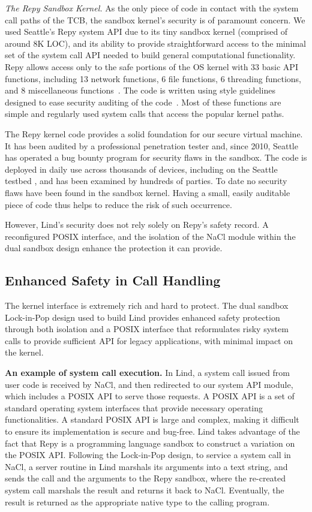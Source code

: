 \textit{The Repy Sandbox Kernel.}
As the only piece of code in contact with the system call paths of the TCB,
the sandbox kernel's security is of paramount concern.
We used Seattle's Repy system API due to its tiny sandbox kernel
(comprised of around 8K LOC), and its ability to provide straightforward
access to the minimal set of the system call API needed to build general
computational functionality. Repy allows
access only to the safe portions of the OS kernel with 33 basic API
functions, including 13 network functions, 6 file functions, 6 threading functions,
and 8 miscellaneous functions~\cite{Repy-10, RepyKernel}. The code is
written using style guidelines designed to ease security auditing
 of the code~\cite{style}. Most of these functions are simple and
regularly used system calls that access the popular kernel paths.

The Repy kernel code provides a solid foundation for our secure virtual
machine. It has been audited by a professional penetration tester and, since 2010,
Seattle has operated a bug bounty program for security flaws in the sandbox.
The code is deployed in daily use across thousands of devices,
including on the Seattle testbed \cite{seattle}, and has been examined by
hundreds of parties. To date no security flaws have been found in the sandbox
kernel. Having a small, easily auditable piece of code thus helps to reduce the
risk of such occurrence.

However, Lind's security does not rely solely on Repy's
safety record. A reconfigured POSIX interface, and the isolation of
the NaCl module within the dual sandbox design enhance the protection it can
provide.

\subsection{Enhanced Safety in Call Handling}

The kernel interface is extremely rich and hard to protect.
The dual sandbox Lock-in-Pop design used to build Lind provides enhanced
safety protection through both isolation and a POSIX interface that
reformulates risky system calls to
provide sufficient API for legacy applications, with minimal impact on the kernel.

\textbf{An example of system call execution.}
In Lind, a system call issued from user code is
received by NaCl, and then redirected to our system API module, which
includes a POSIX API to serve those requests. A POSIX API is a set of standard
operating system interfaces that provide
necessary operating functionalities. A standard POSIX API is large and complex,
making it difficult to ensure its implementation is secure and bug-free.
Lind takes advantage of the fact that Repy is a programming language sandbox to
construct a variation on the POSIX API. Following the
Lock-in-Pop design, to service a system call in NaCl, a server routine in
Lind marshals its arguments into a text string, and sends the call and the arguments
to the Repy sandbox, where the re-created system call marshals the result and
returns it back to NaCl. Eventually, the result is returned as the appropriate
native type to the calling program.

